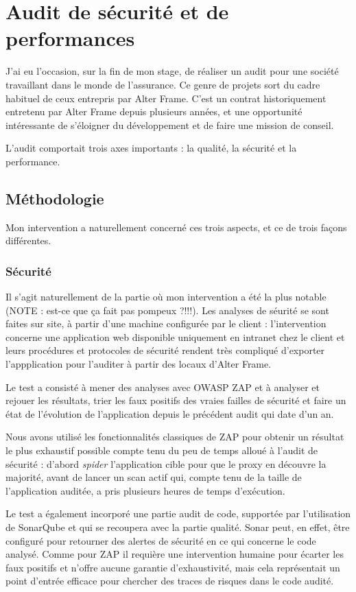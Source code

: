 \section{Audit de sécurité et de performances}
\label{sec:audit}
J'ai eu l'occasion, sur la fin de mon stage, de réaliser un audit pour une société travaillant dans le monde de l'assurance. Ce genre de projets sort du cadre habituel de ceux entrepris par Alter Frame. C'est un contrat historiquement entretenu par Alter Frame depuis plusieurs années, et une opportunité intéressante de s'éloigner du développement et de faire une mission de conseil.

L'audit comportait trois axes importants : la qualité, la sécurité et la performance.

\subsection{Méthodologie}
Mon intervention a naturellement concerné ces trois aspects, et ce de trois façons différentes.

\subsubsection{Sécurité}
Il s'agit naturellement de la partie où mon intervention a été la plus notable (NOTE : est-ce que ça fait pas pompeux ?!!!). Les analyses de séurité se sont faites sur site, à partir d'une machine configurée par le client : l'intervention concerne une application web disponible uniquement en intranet chez le client et leurs procédures et protocoles de sécurité rendent très compliqué d'exporter l'appplication pour l'auditer à partir des locaux d'Alter Frame.

Le test a consisté à mener des analyses avec OWASP ZAP et à analyser et rejouer les résultats, trier les faux positifs des vraies failles de sécurité et faire un état de l'évolution de l'application depuis le précédent audit qui date d'un an.

Nous avons utilisé les fonctionnalités classiques de ZAP pour obtenir un résultat le plus exhaustif possible compte tenu du peu de temps alloué à l'audit de sécurité : d'abord \textit{spider} l'application cible pour que le proxy en découvre la majorité, avant de lancer un scan actif qui, compte tenu de la taille de l'application auditée, a pris plusieurs heures de temps d'exécution.

Le test a également incorporé une partie audit de code, supportée par l'utilisation de SonarQube et qui se recoupera avec la partie qualité. Sonar peut, en effet, être configuré pour retourner des alertes de sécurité en ce qui concerne le code analysé. Comme pour ZAP il requière une intervention humaine pour écarter les faux positifs et n'offre aucune garantie d'exhaustivité, mais cela représentait un point d'entrée efficace pour chercher des traces de risques dans le code audité.

